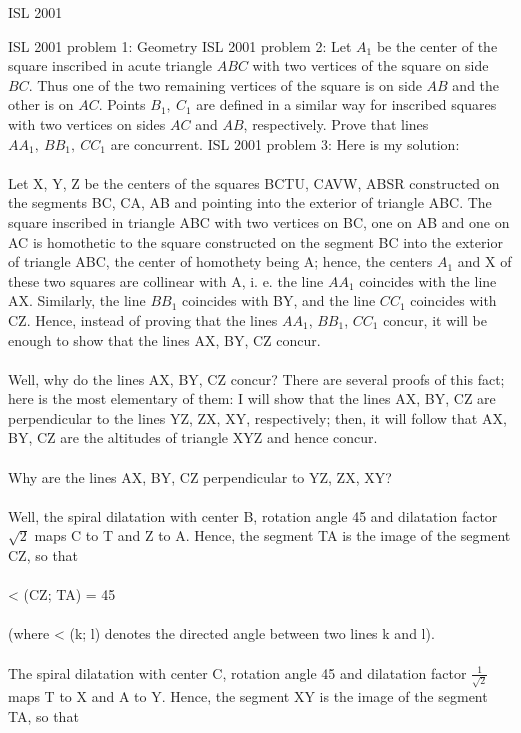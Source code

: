ISL 2001 

ISL 2001 problem 1:  Geometry 
ISL 2001 problem 2:  Let $A_1$ be the center of the square inscribed in acute triangle $ABC$ with two vertices of the square on side $BC$.  Thus one of the two remaining vertices of the square is on side $AB$ and the other is on $AC$. Points $B_1,\ C_1$ are defined in a similar way for inscribed squares with two vertices on sides $AC$ and $AB$, respectively. Prove that lines $AA_1,\ BB_1,\ CC_1$ are concurrent. 
ISL 2001 problem 3:  Here is my solution: \\\\
Let X, Y, Z be the centers of the squares BCTU, CAVW, ABSR constructed on the segments BC, CA, AB and pointing into the exterior of triangle ABC. The square inscribed in triangle ABC with two vertices on BC, one on AB and one on AC is homothetic to the square constructed on the segment BC into the exterior of triangle ABC, the center of homothety being A; hence, the centers $A_1$ and X of these two squares are collinear with A, i. e. the line $AA_1$ coincides with the line AX. Similarly, the line $BB_1$ coincides with BY, and the line $CC_1$ coincides with CZ. Hence, instead of proving that the lines $AA_1$, $BB_1$, $CC_1$ concur, it will be enough to show that the lines AX, BY, CZ concur. \\\\
Well, why do the lines AX, BY, CZ concur? There are several proofs of this fact; here is the most elementary of them: I will show that the lines AX, BY, CZ are perpendicular to the lines YZ, ZX, XY, respectively; then, it will follow that AX, BY, CZ are the altitudes of triangle XYZ and hence concur. \\\\
Why are the lines AX, BY, CZ perpendicular to YZ, ZX, XY? \\\\
Well, the spiral dilatation with center B, rotation angle 45 and dilatation factor $\sqrt2$ maps C to T and Z to A. Hence, the segment TA is the image of the segment CZ, so that \\\\
< (CZ; TA) = 45 \\\\
(where < (k; l) denotes the directed angle between two lines k and l). \\\\
The spiral dilatation with center C, rotation angle 45 and dilatation factor $\frac{1}{\sqrt2}$ maps T to X and A to Y. Hence, the segment XY is the image of the segment TA, so that \\\\
